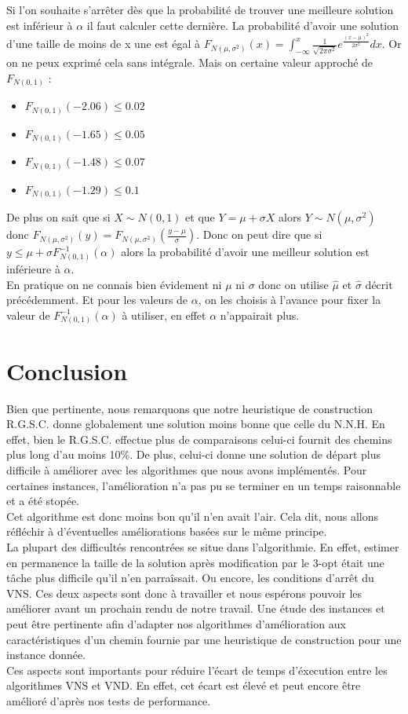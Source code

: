 \documentclass[12pt,a4paper]{article}
\begin{document}
Si l'on souhaite s’arrêter dès que la probabilité de trouver une meilleure solution est inférieur à $\alpha$ il faut calculer cette dernière. La probabilité d'avoir une solution d'une taille de moins de x une est égal à $F_{N(\mu,\sigma^2)} (x) = \int _{- \infty} ^{x} \frac{1}{\sqrt{2 \pi \sigma ^2}} e^{ \frac{\left( x - \mu \right)^2}{2 \sigma^2} } dx$. Or on ne peux exprimé cela sans intégrale. Mais on certaine valeur approché de $F_{N(0,1)}$ :
\begin{itemize}
\item
$F_{N(0,1)} (-2.06) \leqslant 0.02$
\item
$F_{N(0,1)} (-1.65) \leqslant 0.05$
\item
$F_{N(0,1)} (-1.48) \leqslant 0.07$
\item
$F_{N(0,1)} (-1.29) \leqslant 0.1$
\end{itemize}
De plus on sait que si $X \sim N(0,1)$ et que $Y = \mu + \sigma X$ alors $Y \sim N(\mu, \sigma ^2)$ donc $F_{N(\mu,\sigma^2)} (y) = F_{N(\mu , \sigma ^2)} (\frac{y-\mu}{\sigma})$. Donc on peut dire que si $y \leqslant \mu + \sigma F^{-1} _{N(0,1)} ( \alpha)$ alors la probabilité d'avoir une meilleur solution est inférieure à $\alpha$.\\

En pratique on ne connais bien évidement ni $\mu$ ni $\sigma$ donc on utilise $\widehat{\mu}$ et $\widehat{\sigma}$ décrit précédemment. Et pour les valeurs de $\alpha$, on les choisis à l'avance pour fixer la valeur de $F^{-1} _{N(0,1)} ( \alpha)$ à utiliser, en effet $\alpha$ n’appairait plus.

\section{Conclusion}
Bien que pertinente, nous remarquons que notre heuristique de construction R.G.S.C. donne globalement une solution moins bonne que celle du N.N.H. En effet, bien le R.G.S.C. effectue plus de comparaisons celui-ci fournit des chemins plus long d'au moins 10\%. De plus, celui-ci donne une solution de départ plus difficile à améliorer avec les algorithmes que nous avons implémentés. Pour certaines instances, l'amélioration n'a pas pu se terminer en un temps raisonnable et a été stopée.\\
Cet algorithme est donc moins bon qu'il n'en avait l'air. Cela dit, nous allons réfléchir à d'éventuelles améliorations basées sur le même principe.\\
La plupart des difficultés rencontrées se situe dans l'algorithmie. En effet, estimer en permanence la taille de la solution après modification par le 3-opt était une tâche plus difficile qu'il n'en parraîssait. Ou encore, les conditions d'arrêt du VNS. Ces deux aspects sont donc à travailler et nous espérons pouvoir les améliorer avant un prochain rendu de notre travail. Une étude des instances et peut être pertinente afin d'adapter nos algorithmes d'amélioration aux caractéristiques d'un chemin fournie par une heuristique de construction pour une instance donnée.\\
Ces aspects sont importants pour réduire l'écart de temps d'éxecution entre les algorithmes VNS et VND. En effet, cet écart est élevé et peut encore être amélioré d'après nos tests de performance.\\
\end{document}
